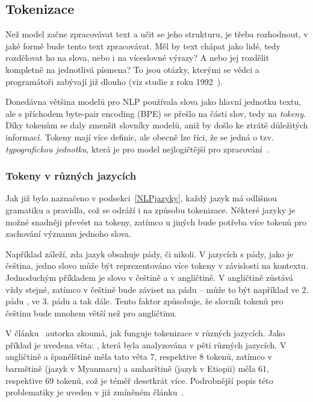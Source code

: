 \subsection{Tokenizace}
Než model začne zpracovávat text a učit se jeho strukturu, je třeba rozhodnout, v jaké formě bude tento text zpracovávat. Měl by text chápat jako lidé, tedy rozdělovat ho na slova, nebo i na víceslovné výrazy? A nebo jej rozdělit kompletně na jednotlivá písmena? To jsou otázky, kterými se vědci a programátoři zabývají již dlouho (viz studie z roku 1992~\cite{webster-kit-1992-tokenization}).

Donedávna většina modelů pro NLP používala slova jako hlavní jednotku textu, ale s příchodem byte-pair encoding (BPE) se přešlo na části slov, tedy na \emph{tokeny}. Díky tokenům se daly zmenšit slovníky modelů, aniž by došlo ke ztrátě důležitých informací. Tokeny mají více definic, ale obecně lze říci, že se jedná o tzv. \emph{typografickou jednotku}, která je pro model nejlogičtější pro zpracování~\cite{mielke2021wordscharactersbriefhistory}.

\subsubsection{Tokeny v různých jazycích}\label{TokenJaz}
Jak již bylo naznačeno v podsekci~\ref{NLPjazyky}, každý jazyk má odlišnou gramatiku a pravidla, což se odráží i na způsobu tokenizace. Některé jazyky je možné snadněji převést na tokeny, zatímco u jiných bude potřeba více tokenů pro zachování významu jednoho slova.

Například záleží, zda jazyk obsahuje pády, či nikoli. V jazycích s pády, jako je čeština, jedno slovo může být reprezentováno více tokeny v závislosti na kontextu. Jednoduchým příkladem je slovo  v češtině a  v angličtině. V angličtině zůstává  vždy stejné, zatímco v češtině bude záviset na pádu -- může to být například ve 2. pádu , ve 3. pádu  a tak dále. Tento faktor způsobuje, že slovník tokenů pro češtinu bude mnohem větší než pro angličtinu.

V článku~\cite{tokenizacemultilingual} autorka zkoumá, jak funguje tokenizace v různých jazycích. Jako příklad je uvedena věta: , která byla analyzována v pěti různých jazycích. V angličtině a španělštině měla tato věta 7, respektive 8 tokenů, zatímco v barmštině (jazyk v Myanmaru) a amharštině (jazyk v Etiopii) měla 61, respektive 69 tokenů, což je téměř desetkrát více. Podrobnější popis této problematiky je uveden v již zmíněném článku~\cite{tokenizacemultilingual}.

